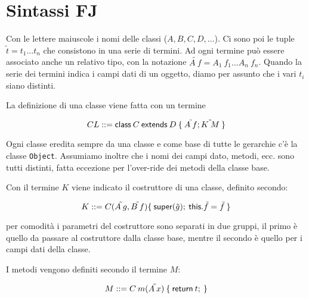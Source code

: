 

\section{Sintassi FJ}

Con le lettere maiuscole i nomi delle classi ($A, B, C, D, \ldots$). 
Ci sono poi le tuple $\tilde{t} = t_1 \ldots t_n$ che consistono in una serie di termini. Ad ogni termine può essere associato anche un relativo tipo, con la notazione $\tilde{A\: f} = A_1 \: f_1 \ldots A_n \: f_n$.
Quando la serie dei termini indica i campi dati di un oggetto, diamo per assunto che i vari $t_i$ siano distinti.

La definizione di una classe viene fatta con un termine

$$
CL ::= \class{C}{D}{\tilde{A \: f}; \tilde{K \: M}}
$$

\noindent Ogni classe eredita sempre da una classe e come base di tutte le gerarchie c'è la classe \texttt{Object}. Assumiamo inoltre che i nomi dei campi dato, metodi, ecc. sono tutti distinti, fatta eccezione per l'over-ride dei metodi della classe base.

Con il termine $K$ viene indicato il costruttore di una classe, definito secondo:

$$
K ::= \construct{C}{\tilde{A\:g}, \tilde{B\:f}}{\super (\tilde{g}) ; \: \this.\tilde{f} = \tilde{f}}
$$

\noindent per comodità i parametri del costruttore sono separati in due gruppi, il primo è quello da passare al costruttore dalla classe base, mentre il secondo è quello per i campi dati della classe.

I metodi vengono definiti secondo il termine $M$:

$$
M ::= \method{C}{m}{\tilde{A \: x}}{t}
$$

